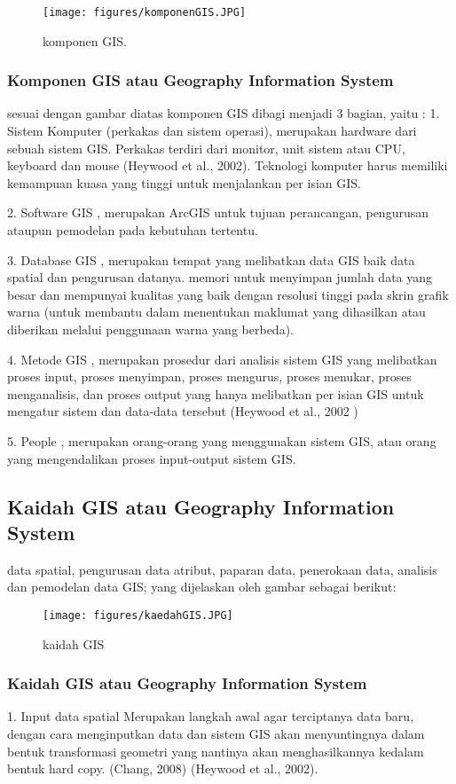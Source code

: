 \begin{figure}[ht]
	\centerline{\texttt{[image: figures/komponenGIS.JPG]}}
	\caption{komponen GIS.}
	\label{komponen GIS}
	\end{figure}

\subsubsection{Komponen GIS atau Geography Information System}
sesuai dengan gambar diatas komponen GIS dibagi menjadi 3 bagian, yaitu :
1. Sistem Komputer (perkakas dan sistem operasi), merupakan hardware dari sebuah sistem GIS. Perkakas terdiri dari monitor, unit sistem atau CPU, keyboard dan mouse (Heywood et al., 2002). Teknologi komputer harus memiliki kemampuan kuasa
yang tinggi untuk menjalankan per isian GIS.

2. Software GIS , merupakan ArcGIS untuk tujuan perancangan, pengurusan ataupun pemodelan pada kebutuhan tertentu.

3. Database GIS , merupakan tempat yang melibatkan data GIS baik data spatial dan pengurusan datanya. memori untuk menyimpan jumlah data yang besar dan mempunyai kualitas yang baik dengan resolusi tinggi pada skrin grafik warna (untuk membantu dalam menentukan maklumat yang dihasilkan atau diberikan melalui penggunaan warna yang berbeda).

4. Metode GIS , merupakan prosedur dari analisis sistem GIS yang melibatkan proses input, proses menyimpan, proses mengurus, proses menukar, proses menganalisis, dan proses output yang hanya melibatkan per isian GIS untuk mengatur sistem dan data-data tersebut (Heywood et al., 2002 )

5. People , merupakan orang-orang yang menggunakan sistem GIS, atau orang yang mengendalikan proses input-output sistem GIS. 

\subsection{Kaidah GIS atau Geography Information System}
data spatial, pengurusan data atribut, paparan data, penerokaan data, analisis dan pemodelan data GIS;
yang dijelaskan oleh gambar sebagai berikut:
\begin{figure}[ht]
	\centerline{\texttt{[image: figures/kaedahGIS.JPG]}}
	\caption{kaidah GIS}
	\label{kaidah GIS}
	\end{figure}

\subsubsection{Kaidah GIS atau Geography Information System}
1. Input data spatial
Merupakan langkah awal agar terciptanya data baru, dengan cara menginputkan data dan sistem GIS akan menyuntingnya dalam bentuk transformasi geometri yang nantinya akan menghasilkannya kedalam bentuk hard copy. (Chang, 2008) 
(Heywood et al., 2002).

